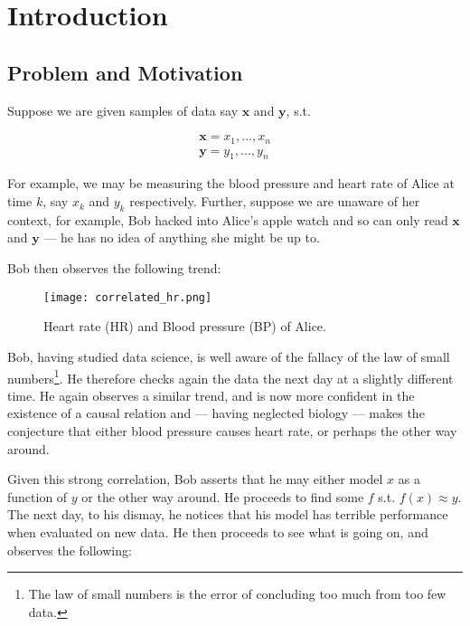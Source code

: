 
\chapter{Introduction}

\section{Problem and Motivation}

Suppose we are given samples of data say $\mathbf{x}$ and $\mathbf{y}$, s.t.

\begin{align*}
    \mathbf{x} = x_1, ..., x_n  \\
    \mathbf{y} = y_1, ..., y_n 
\end{align*}

For example, we may be measuring the blood pressure and heart rate of Alice at time $k$, 
say $x_k$ and $y_k$ respectively. Further, suppose we are unaware of her context, for example,
Bob hacked into Alice's apple watch and so can only read $\mathbf{x}$ and $\mathbf{y}$ --- he has no idea of 
anything she might be up to.

Bob then observes the following trend:

\begin{figure}[H]
    \centering
    \texttt{[image: correlated\_hr.png]}
    \caption{Heart rate (HR) and Blood pressure (BP) of Alice.}
\end{figure}

Bob, having studied data science, is well aware of the fallacy of the law of small numbers\footnote{
    The law of small numbers is the error of concluding too much from too few data. 
}. He therefore checks again the data the next day at a slightly different time. He again observes 
a similar trend, and is now more confident in the existence of a causal relation and --- having neglected biology --- 
makes the conjecture that either blood pressure causes heart rate, or 
perhaps the other way around. 

Given this strong correlation, Bob asserts that he may either model $x$ as a function of $y$ or the other way 
around. He proceeds to find some $f$ s.t. $f(x) \approx y$. The next day, to his dismay, he notices that his
model has terrible performance when evaluated on new data. He then proceeds to see what is going on, and 
observes the following:

